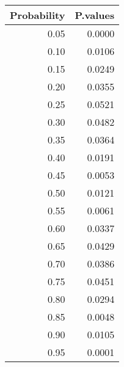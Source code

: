 \begin{table}[ht]
\centering
\begin{tabular}{rr}
  \hline
Probability & P.values \\ 
  \hline
0.05 & 0.0000 \\ 
  0.10 & 0.0106 \\ 
  0.15 & 0.0249 \\ 
  0.20 & 0.0355 \\ 
  0.25 & 0.0521 \\ 
  0.30 & 0.0482 \\ 
  0.35 & 0.0364 \\ 
  0.40 & 0.0191 \\ 
  0.45 & 0.0053 \\ 
  0.50 & 0.0121 \\ 
  0.55 & 0.0061 \\ 
  0.60 & 0.0337 \\ 
  0.65 & 0.0429 \\ 
  0.70 & 0.0386 \\ 
  0.75 & 0.0451 \\ 
  0.80 & 0.0294 \\ 
  0.85 & 0.0048 \\ 
  0.90 & 0.0105 \\ 
  0.95 & 0.0001 \\ 
   \hline
\end{tabular}
\end{table}
